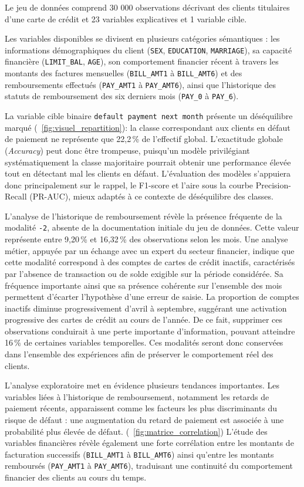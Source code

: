 \documentclass{article}
\begin{document}
Le jeu de données comprend 30 000 observations décrivant des clients titulaires d'une carte de crédit et 23 variables explicatives et 1 variable cible.

Les variables disponibles se divisent en plusieurs catégories sémantiques : les informations démographiques du client (\texttt{SEX}, \texttt{EDUCATION}, \texttt{MARRIAGE}), sa capacité financière (\texttt{LIMIT\_BAL}, \texttt{AGE}), son comportement financier récent à travers les montants des factures mensuelles (\texttt{BILL\_AMT1} à \texttt{BILL\_AMT6}) et des remboursements effectués (\texttt{PAY\_AMT1} à \texttt{PAY\_AMT6}), ainsi que l'historique des statuts de remboursement des six derniers mois (\texttt{PAY\_0} à \texttt{PAY\_6}).

La variable cible binaire \texttt{default payment next month} présente un déséquilibre marqué (~\ref{fig:visuel_repartition}): la classe correspondant aux clients en défaut de paiement ne représente que 22,2\,\% de l'effectif global. L'exactitude globale (\textit{Accuracy}) peut donc être trompeuse, puisqu'un modèle privilégiant systématiquement la classe majoritaire pourrait obtenir une performance élevée tout en détectant mal les clients en défaut. L'évaluation des modèles s'appuiera donc principalement sur le rappel, le F1-score et l'aire sous la courbe Precision-Recall (PR-AUC), mieux adaptés à ce contexte de déséquilibre des classes.


L'analyse de l'historique de remboursement révèle la présence fréquente de la modalité \texttt{-2}, absente de la documentation initiale du jeu de données. Cette valeur représente entre 9,20\,\% et 16,32\,\% des observations selon les mois. Une analyse métier, appuyée par un échange avec un expert du secteur financier, indique que cette modalité correspond à des comptes de cartes de crédit inactifs, caractérisés par l'absence de transaction ou de solde exigible sur la période considérée. Sa fréquence importante ainsi que sa présence cohérente sur l'ensemble des mois permettent d'écarter l'hypothèse d'une erreur de saisie. La proportion de comptes inactifs diminue progressivement d'avril à septembre, suggérant une activation progressive des cartes de crédit au cours de l'année. De ce fait, supprimer ces observations conduirait à une perte importante d'information, pouvant atteindre 16\,\% de certaines variables temporelles. Ces modalités seront donc conservées dans l'ensemble des expériences afin de préserver le comportement réel des clients.

L'analyse exploratoire met en évidence plusieurs tendances importantes. Les variables liées à l'historique de remboursement, notamment les retards de paiement récents, apparaissent comme les facteurs les plus discriminants du risque de défaut : une augmentation du retard de paiement est associée à une probabilité plus élevée de défaut. (~\ref{fig:matrice_correlation})
L'étude des variables financières révèle également une forte corrélation entre les montants de facturation successifs (\texttt{BILL\_AMT1} à \texttt{BILL\_AMT6}) ainsi qu'entre les montants remboursés (\texttt{PAY\_AMT1} à \texttt{PAY\_AMT6}), traduisant une continuité du comportement financier des clients au cours du temps.
\end{document}
